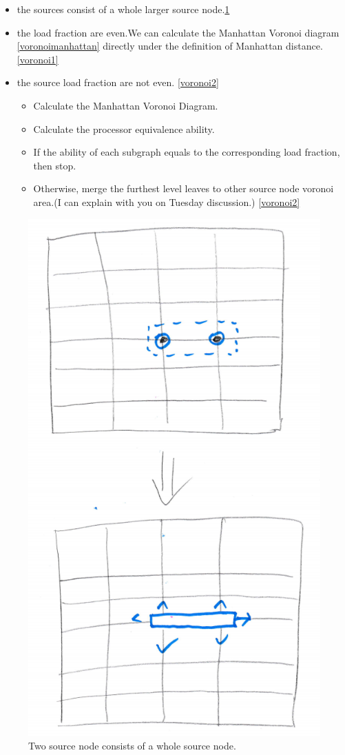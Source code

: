 \documentclass[preprint,12pt]{elsarticle}
\begin{document}
\begin{itemize}
\item the sources consist of a whole larger source node.\ref{subgrah1}

\item the load fraction are even.We can calculate the Manhattan Voronoi diagram \ref{voronoimanhattan} directly under the definition of Manhattan distance.\ref{voronoi1}

\item the source load fraction are not even. \ref{voronoi2}
\begin{itemize}
\item Calculate the Manhattan Voronoi Diagram.
\item Calculate the processor equivalence ability.
\item If the ability of each subgraph equals to the corresponding load fraction, then stop.
\item Otherwise, merge the furthest level leaves to other source node voronoi area.(I can explain with you on Tuesday discussion.) \ref{voronoi2}
\end{itemize}
\end{itemize}


\begin{figure}[h]
\centering\includegraphics[width=0.7\linewidth]{subgraph1}
\caption{Two source node consists of a whole source node. }
\label{subgrah1}
\end{figure}
\end{document}
